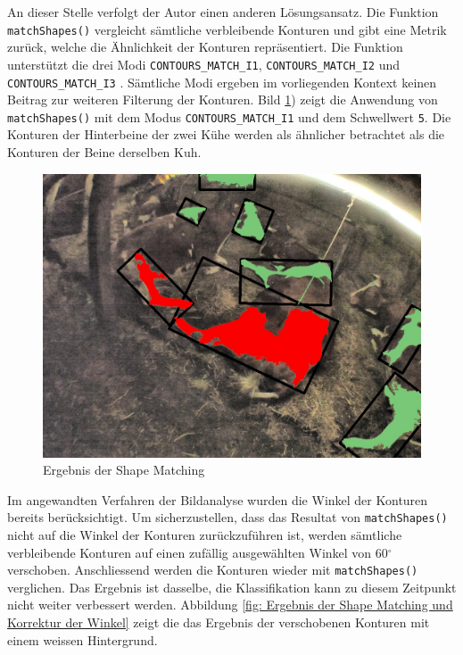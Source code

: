 An dieser Stelle verfolgt der Autor einen anderen Lösungsansatz. Die Funktion \texttt{matchShapes()} vergleicht sämtliche verbleibende Konturen und gibt eine Metrik zurück, welche die Ähnlichkeit der Konturen repräsentiert. Die Funktion unterstützt die drei Modi \texttt{CONTOURS_MATCH_I1}, \texttt{CONTOURS_MATCH_I2} und \texttt{CONTOURS_MATCH_I3} \citep[S. 392]{FernandezVillan2019}. Sämtliche Modi ergeben im vorliegenden Kontext keinen Beitrag zur weiteren Filterung der Konturen. Bild \ref{fig: Ergebnis der Shape Matching}) zeigt die Anwendung von \texttt{matchShapes()} mit dem Modus \texttt{CONTOURS_MATCH_I1} und dem Schwellwert \texttt{5}. Die Konturen der Hinterbeine der zwei Kühe werden als ähnlicher betrachtet als die Konturen der Beine derselben Kuh. 

\begin{figure}[H]
	\center
	\includegraphics[scale=0.43]{Grafiken/entwicklung/31FilteredBySimilarity.jpg}
	\caption{Ergebnis der Shape Matching} 
	\label{fig: Ergebnis der Shape Matching} 
\end{figure}
Im angewandten Verfahren der Bildanalyse wurden die Winkel der Konturen bereits berücksichtigt. Um sicherzustellen, dass das Resultat von \texttt{matchShapes()} nicht auf die Winkel der Konturen zurückzuführen ist, werden sämtliche verbleibende Konturen auf einen zufällig ausgewählten Winkel von 60$^{\circ}$ verschoben. Anschliessend werden die Konturen wieder mit \texttt{matchShapes()} verglichen. Das Ergebnis ist dasselbe, die Klassifikation kann zu diesem Zeitpunkt nicht weiter verbessert werden. Abbildung \ref{fig: Ergebnis der Shape Matching und Korrektur der Winkel} zeigt die das Ergebnis der verschobenen Konturen mit einem weissen Hintergrund.
